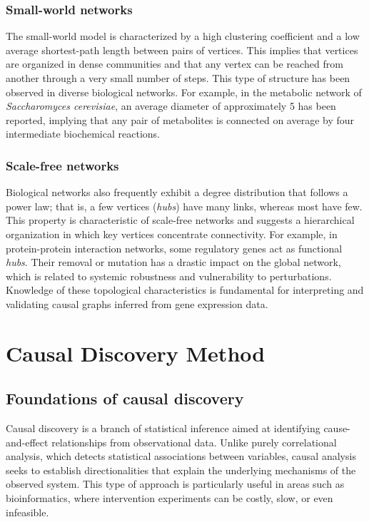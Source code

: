 \documentclass[12pt,a4paper]{report}
\begin{document}
\subsection*{Small-world networks}

The small-world model is characterized by a high clustering coefficient and a low average shortest-path length between pairs of vertices. This implies that vertices are organized in dense communities and that any vertex can be reached from another through a very small number of steps\cite{small}. This type of structure has been observed in diverse biological networks. For example, in the metabolic network of \textit{Saccharomyces cerevisiae}, an average diameter of approximately 5 has been reported\cite{d5}, implying that any pair of metabolites is connected on average by four intermediate biochemical reactions.

\subsection*{Scale-free networks}

Biological networks also frequently exhibit a degree distribution that follows a power law; that is, a few vertices (\textit{hubs}) have many links, whereas most have few. This property is characteristic of scale-free networks and suggests a hierarchical organization in which key vertices concentrate connectivity\cite{scale}. For example, in protein-protein interaction networks, some regulatory genes act as functional \textit{hubs}\cite{ppi}. Their removal or mutation has a drastic impact on the global network, which is related to systemic robustness and vulnerability to perturbations\cite{robus}.
\\

Knowledge of these topological characteristics is fundamental for interpreting and validating causal graphs inferred from gene expression data.  

\newpage

\chapter{Causal Discovery Method}
\section{Foundations of causal discovery}

Causal discovery is a branch of statistical inference aimed at identifying cause-and-effect relationships from observational data\cite{inference}. Unlike purely correlational analysis, which detects statistical associations between variables, causal analysis seeks to establish directionalities that explain the underlying mechanisms of the observed system. This type of approach is particularly useful in areas such as bioinformatics, where intervention experiments can be costly, slow, or even infeasible.
\end{document}
